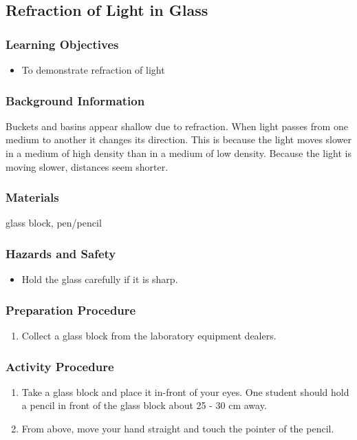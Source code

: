\subsection{Refraction of Light in Glass}

\subsubsection*{Learning Objectives}
\begin{itemize}
\item{To demonstrate refraction of light} 
\end{itemize}

\subsubsection*{Background Information}
Buckets and basins appear shallow due to refraction. When light passes from one medium to another it changes its direction. This is because the light moves slower in a medium of high density than in a medium of low density. Because the light is moving slower, distances seem shorter.  

\subsubsection*{Materials}
glass block, pen/pencil

\subsubsection*{Hazards and Safety}
\begin{itemize}
\item{Hold the glass carefully if it is sharp.} 
\end{itemize}

\subsubsection*{Preparation Procedure}
\begin{enumerate}
\item{Collect a glass block from the laboratory equipment dealers.} 
\end{enumerate}

\subsubsection*{Activity Procedure}
\begin{enumerate}
\item{Take a glass block and place it in-front of your eyes. One student should hold a pencil in front of the glass block about 25 - 30 cm away.} 
\item{From above, move your hand straight and touch the pointer of the pencil.} 
\end{enumerate}

